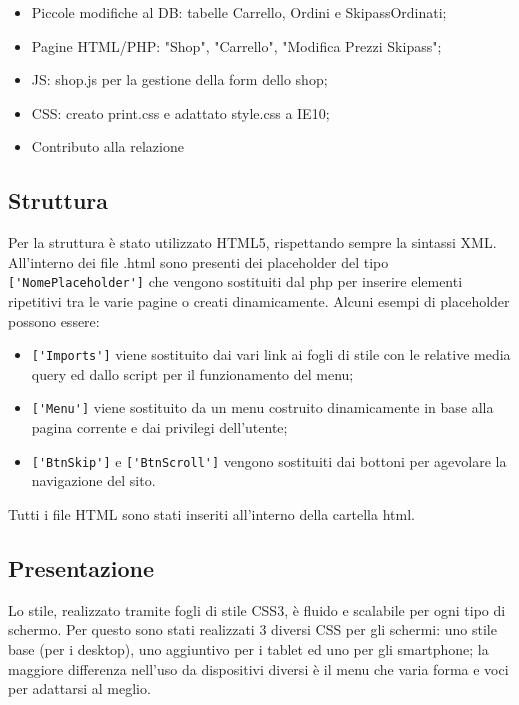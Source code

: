 \begin{itemize}
        \begin{itemize}
            \item Piccole modifiche al DB: tabelle Carrello, Ordini e SkipassOrdinati;
            \item Pagine HTML/PHP: "Shop", "Carrello", "Modifica Prezzi Skipass";
            \item JS: shop.js per la gestione della form dello shop;
            \item CSS: creato print.css e adattato style.css a IE10;
            \item Contributo alla relazione
        \end{itemize}
\end{itemize}

\subsection{Struttura}
    Per la struttura è stato utilizzato HTML5, rispettando sempre la sintassi XML.
    All'interno dei file .html sono presenti dei placeholder del tipo \verb|['NomePlaceholder']| che vengono sostituiti dal php per inserire elementi ripetitivi tra le varie pagine o creati dinamicamente.
    Alcuni esempi di placeholder possono essere:
    \begin{itemize}
        \item \verb|['Imports']| viene sostituito dai vari link ai fogli di stile con le relative media query ed dallo script per il funzionamento del menu;
        \item \verb|['Menu']| viene sostituito da un menu costruito dinamicamente in base alla pagina corrente e dai privilegi dell'utente;
        \item \verb|['BtnSkip']| e \verb|['BtnScroll']| vengono sostituiti dai bottoni per agevolare la navigazione del sito.
    \end{itemize}
    Tutti i file HTML sono stati inseriti all'interno della cartella html.

\subsection{Presentazione}
Lo stile, realizzato tramite fogli di stile CSS3, è fluido e scalabile per ogni tipo di schermo.
Per questo sono stati realizzati 3 diversi CSS per gli schermi: uno stile base (per i desktop), uno aggiuntivo per i tablet ed uno per gli smartphone;
la maggiore differenza nell'uso da dispositivi diversi è il menu che varia forma e voci per adattarsi al meglio.

